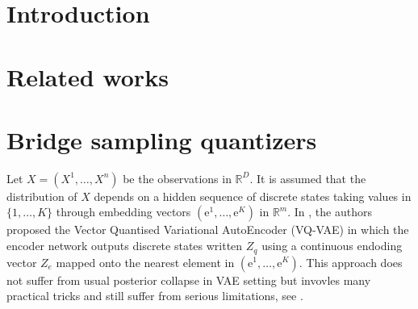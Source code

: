 \documentclass{article}
\title{}
\date{}
\author[$\dag$]{XXX}
\affil[$\dag$]{{\small CMAP, \'Ecole Polytechnique, Institut Polytechnique de Paris, Palaiseau.}}
\newcommand{\rset}{\ensuremath{\mathbb{R}}}
\newcommand{\rme}{\mathrm{e}}
\begin{document}
\maketitle

\begin{abstract}

\end{abstract}

\section{Introduction}
\section{Related works}
\section{Bridge sampling quantizers}
 Let $X = (X^1,\ldots,X^n)$ be the observations in $\rset^D$.  It is assumed that the distribution of $X$ depends on a hidden sequence of discrete states taking values in $\{1,\ldots,K\}$ through  embedding vectors $(\rme^1,\ldots,\rme^K)$ in $\rset^m$. In  \cite{oord2017neural}, the authors proposed the Vector Quantised Variational AutoEncoder (VQ-VAE) in which  the encoder network outputs discrete states written $Z_q$ using a continuous endoding vector $Z_e$ mapped onto the nearest element in $(\rme^1,\ldots,\rme^K)$. This approach  does not suffer from usual posterior collapse in VAE setting but invovles many practical tricks and still suffer from serious limitations, see \cite{}.
\end{document}
